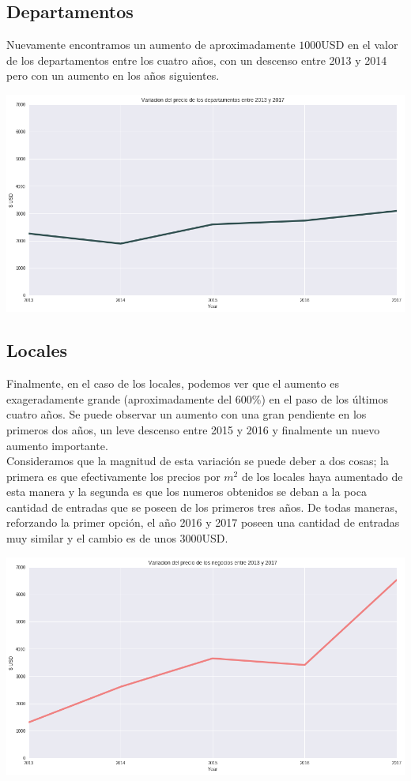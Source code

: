 \documentclass[a4paper, 10pt]{article}
\newcommand\tab[1][0.5cm]{\hspace*{#1}}
\begin{document}
			\subsection{Departamentos}
				Nuevamente encontramos un aumento de aproximadamente $1000$USD en el valor de los departamentos entre los cuatro
				años, con un descenso entre 2013 y 2014 pero con un aumento en los años siguientes.
				\begin{center}
   		    			\includegraphics[width=\textwidth]{images/apartmentsVariation}
				\end{center}
			\subsection{Locales}
				Finalmente, en el caso de los locales, podemos ver que el aumento es exageradamente grande (aproximadamente del
				$600\%$) en el paso de los últimos cuatro años. Se puede observar un aumento con una gran pendiente en los primeros
				dos años, un leve descenso entre 2015 y 2016 y finalmente un nuevo aumento importante. \\
				\tab Consideramos que la magnitud de esta variación se puede deber a dos cosas; la primera es que efectivamente los
				precios por $m^2$ de los locales haya aumentado de esta manera y la segunda es que los numeros obtenidos se deban
				a la poca cantidad de entradas que se poseen de los primeros tres años. De todas maneras, reforzando la primer
				opción, el año 2016 y 2017 poseen una cantidad de entradas muy similar y el cambio es de unos $3000$USD.
				\begin{center}
   		    			\includegraphics[width=\textwidth]{images/storeVariation}
				\end{center}
\end{document}
